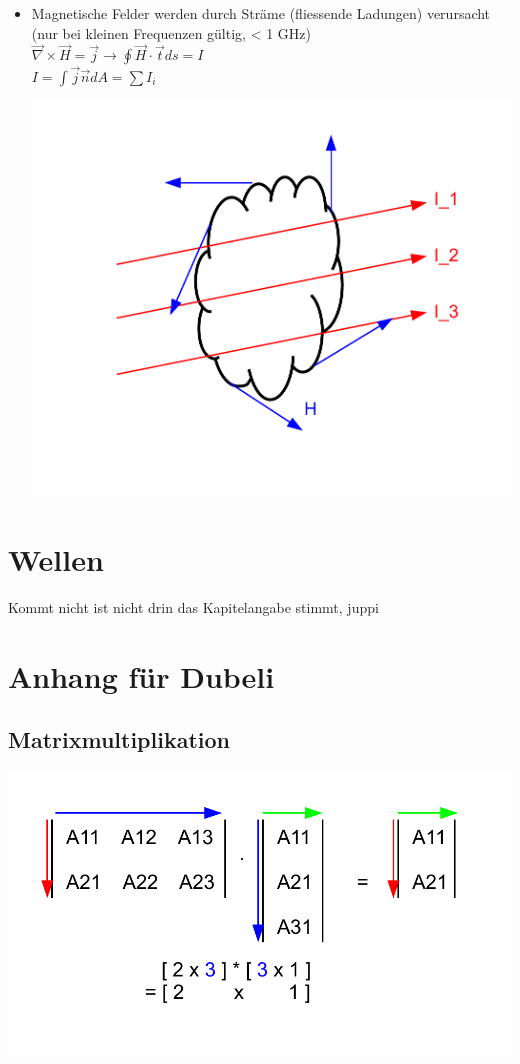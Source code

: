 \documentclass[a4paper, 10pt]{scrartcl}
\begin{document}
\begin{itemize}
	\item Magnetische Felder werden durch Sträme (fliessende Ladungen) verursacht
	(nur bei kleinen Frequenzen gültig, < 1 GHz)\\
	$\vec \nabla \times \vec H = \vec j \rightarrow \oint \vec H \cdot \vec t ds =
	I$\\
	$I=\int \vec j \vec n dA = \sum I_i$
	\begin{center}
		\includegraphics[scale=0.5]{images/maxwell_4.pdf}
	\end{center}
	
\end{itemize}


\section{Wellen}

Kommt nicht ist nicht drin das Kapitelangabe stimmt, juppi

\section{Anhang für Dubeli}
\subsection{Matrixmultiplikation}
\includegraphics[scale=0.5]{images/matrixmultiplikation.pdf}
\end{document}
